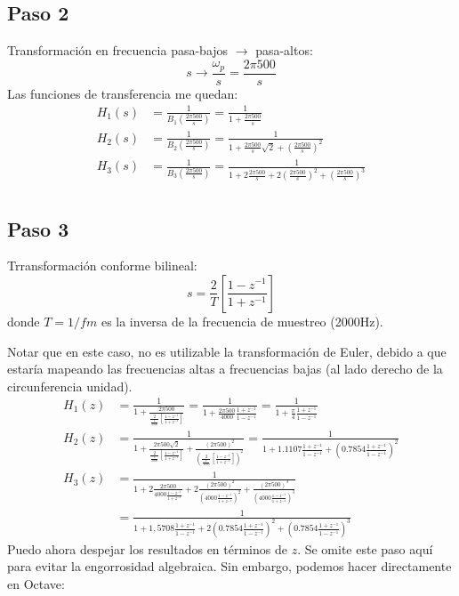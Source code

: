 \documentclass[a4paper]{article}
\begin{document}
\subsection*{Paso 2}
Transformación en frecuencia pasa-bajos $\rightarrow$ pasa-altos:
\begin{equation*}
s\rightarrow\frac{\omega_p}{s}=\frac{2\pi500}{s}
\end{equation*}
Las funciones de transferencia me quedan:
\begin{align*}
H_1(s)&=\frac{1}{B_1\left(\frac{2\pi500}{s}\right)}
       =\frac{1}{1+\frac{2\pi500}{s}}\\
%
H_2(s)&=\frac{1}{B_2\left(\frac{2\pi500}{s}\right)}
       =\frac{1}{1+\frac{2\pi500}{s}\sqrt{2}+\left(\frac{2\pi500}{s}\right)^2}\\
%
H_3(s)&=\frac{1}{B_3\left(\frac{2\pi500}{s}\right)}
       =\frac{1}{1+2\frac{2\pi500}{s}+2\left(\frac{2\pi500}{s}\right)^2
             +\left(\frac{2\pi500}{s}\right)^3}\\
\end{align*}
\subsection*{Paso 3}
Trransformación conforme bilineal:
\begin{equation*}
	s=\frac{2}{T}\left[\frac{1-z^{-1}}{1+z^{-1}}\right]
\end{equation*}
donde $T=1/fm$ es la inversa de la frecuencia de muestreo (2000Hz).

Notar que en este caso, no es utilizable la transformación de Euler, debido a
que estaría mapeando las frecuencias altas a frecuencias bajas (al lado derecho
de la circunferencia unidad).
\begin{align*}
H_1(z)&=\frac{1}{1+\frac{2\pi500}{\frac{2}{\frac{1}{2000}}
		                          \left[\frac{1-z^{-1}}{1+z^{-1}}\right]}}
		=\frac{1}{1+\frac{2\pi500}{4000}\frac{1+z^{-1}}{1-z^{-1}}}
		=\frac{1}{1+\frac{\pi}{4}\frac{1+z^{-1}}{1-z^{-1}}}\\
	H_2(z)&=\frac{1}{1+    \frac{2\pi500\sqrt{2}}{   \frac{2}{  \frac{1}{2000}}
		\left[ \frac{1-z^{-1}}{1+z^{-1}} \right]}    +
		\frac{(2\pi500)^2}{   \left(  \frac{2}{ \frac{1}{2000} }  
		\left[ \frac{1-z^{-1}}{1+z^{-1}} \right]   \right)^2   }}
		=\frac{1}{1+  1.1107\frac{1+z^{-1}}{1-z^{-1}}
		+ \left(  0.7854\frac{1+z^{-1}}{1-z^{-1}}  \right)^2  }\\
	H_3(z)&=\frac{1}{1+2\frac{2\pi500}{ 4000\frac{1-z^{-1}}{1+z^{-1}} }+
		2\frac{(2\pi500)^2}{\left(4000\frac{1-z^{-1}}{1+z^{-1}}\right)^2}+
		\frac{(2\pi500)^3}{\left(4000\frac{1-z^{-1}}{1+z^{-1}}\right)^3}}\\
		&=\frac{1}{ 1+1,5708\frac{1+z^{-1}}{1-z^{-1}} +
		2\left(  0.7854\frac{1+z^{-1}}{1-z^{-1}}  \right)^2+
		\left(  0.7854\frac{1+z^{-1}}{1-z^{-1}}  \right)^3}%
\end{align*}
Puedo ahora despejar los resultados en términos de $z$. Se omite este paso aquí
para evitar la engorrosidad algebraica. Sin embargo, podemos hacer directamente
en Octave:
\end{document}
